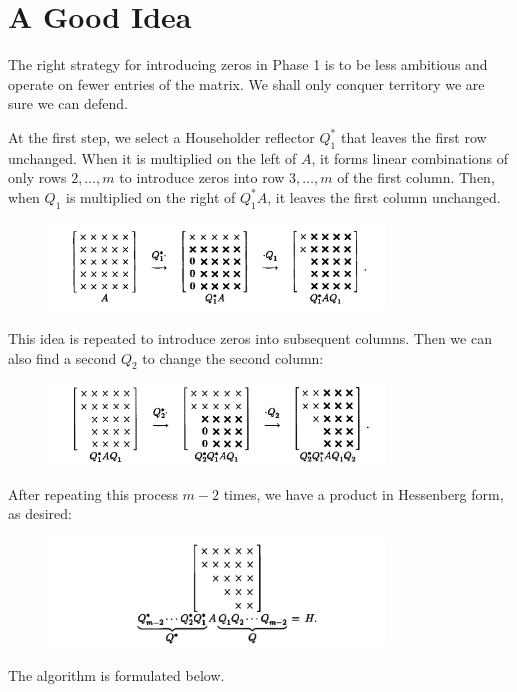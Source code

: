 \section{A Good Idea}
The right strategy for introducing zeros in Phase 1 is to be less ambitious and operate on fewer entries of the matrix. We shall only conquer territory we are sure we can defend. 

At the first step, we select a Householder reflector $Q_1^*$ that leaves the first row unchanged. When it is multiplied on the left of $A$, it forms linear combinations of only rows $2,\ldots ,m$ to introduce zeros into row $3,\ldots ,m$ of the first column. Then, when $Q_1$ is multiplied on the right of $Q_1^*A$, it leaves the first column unchanged. 
\begin{figure}[H]
    \centering
    \includegraphics[width=0.8\textwidth]{figures/26-3.png}
\end{figure}
This idea is repeated to introduce zeros into subsequent columns. Then we can also find a second $Q_2$ to change the second column: 
\begin{figure}[H]
    \centering
    \includegraphics[width=0.8\textwidth]{figures/26-4.png}
\end{figure}
After  repeating this process $m-2$ times, we have a product in Hessenberg form, as desired: 
\begin{figure}[H]
    \centering
    \includegraphics[width=0.8\textwidth]{figures/26-5.png}
\end{figure}
The algorithm is formulated below.  

